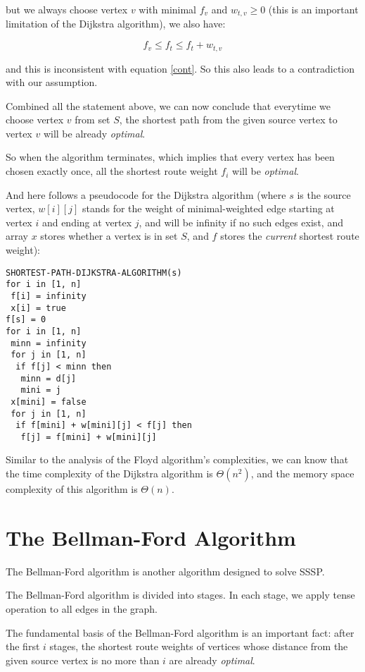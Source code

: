 \documentclass[a4paper,11pt,twocolumn]{article}
\begin{document}
but we always choose vertex $v$ with minimal $f_v$ and $w_{t,v}\ge 0$ (this is an important limitation of the Dijkstra algorithm), we also have: 

$$f_v\le f_t\le f_t+w_{t,v}$$

and this is inconsistent with equation \ref{cont}. So this also leads to a contradiction with our assumption. 

Combined all the statement above, we can now conclude that everytime we choose vertex $v$ from set $S$, the shortest path from the given source vertex to vertex $v$ will be already \emph{optimal}. 

So when the algorithm terminates, which implies that every vertex has been chosen exactly once, all the shortest route weight $f_i$ will be \emph{optimal}. 

And here follows a pseudocode for the Dijkstra algorithm (where $s$ is the source vertex, $w[i][j]$ stands for the weight of minimal-weighted edge starting at vertex $i$ and ending at vertex $j$, and will be infinity if no such edges exist, and array $x$ stores whether a vertex is in set $S$, and $f$ stores the \emph{current} shortest route weight): 

\begin{verbatim}
SHORTEST-PATH-DIJKSTRA-ALGORITHM(s)
for i in [1, n]
 f[i] = infinity
 x[i] = true
f[s] = 0
for i in [1, n]
 minn = infinity
 for j in [1, n]
  if f[j] < minn then
   minn = d[j]
   mini = j
 x[mini] = false
 for j in [1, n]
  if f[mini] + w[mini][j] < f[j] then
   f[j] = f[mini] + w[mini][j]
\end{verbatim}

Similar to the analysis of the Floyd algorithm's complexities, we can know that the time complexity of the Dijkstra algorithm is $\Theta(n^2)$, and the memory space complexity of this algorithm is $\Theta(n)$. 

\section{The Bellman-Ford Algorithm}

The Bellman-Ford algorithm is another algorithm designed to solve SSSP. 

The Bellman-Ford algorithm is divided into stages. In each stage, we apply tense operation to all edges in the graph. 

The fundamental basis of the Bellman-Ford algorithm is an important fact: after the first $i$ stages, the shortest route weights of vertices whose distance from the given source vertex is no more than $i$ are already \emph{optimal}. 
\end{document}
